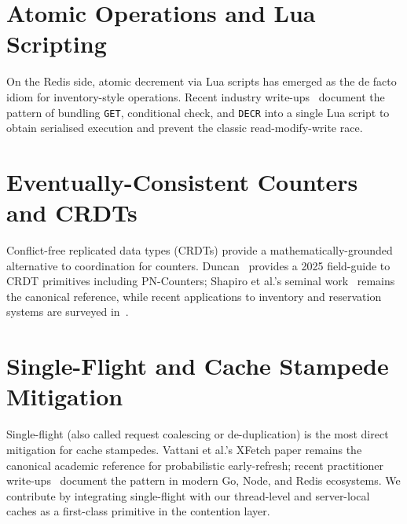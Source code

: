 \section{Atomic Operations and Lua Scripting}
On the Redis side, atomic decrement via Lua scripts has emerged as the de facto idiom for inventory-style operations. Recent industry write-ups~\cite{oneuptime2026lua, oneuptime2026inventory, dev2025redislua} document the pattern of bundling \texttt{GET}, conditional check, and \texttt{DECR} into a single Lua script to obtain serialised execution and prevent the classic read-modify-write race.

\section{Eventually-Consistent Counters and CRDTs}
Conflict-free replicated data types (CRDTs) provide a mathematically-grounded alternative to coordination for counters. Duncan~\cite{duncan2025crdt} provides a 2025 field-guide to CRDT primitives including PN-Counters; Shapiro et al.'s seminal work~\cite{shapiro2011crdt} remains the canonical reference, while recent applications to inventory and reservation systems are surveyed in~\cite{ably2024crdt, ijsoc2025inventory}.

\section{Single-Flight and Cache Stampede Mitigation}
Single-flight (also called request coalescing or de-duplication) is the most direct mitigation for cache stampedes. Vattani et al.'s XFetch paper remains the canonical academic reference for probabilistic early-refresh; recent practitioner write-ups~\cite{1xapi2026singleflight, oneuptime2026stampede, oneuptime2026coalescing} document the pattern in modern Go, Node, and Redis ecosystems. We contribute by integrating single-flight with our thread-level and server-local caches as a first-class primitive in the contention layer.


